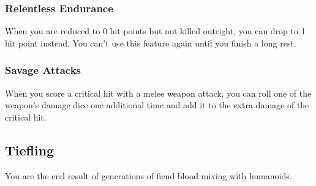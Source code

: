 \documentclass[10pt,twoside]{article}
\begin{document}
\begin{multicols}{2}
\subsubsection*{Relentless Endurance}
When you are reduced to 0 hit points but not killed outright, you can drop to 1 hit point instead. You can't use this feature again until you finish a long rest.

\subsubsection*{Savage Attacks}
When you score a critical hit with a melee weapon attack, you can roll one of the weapon's damage dice one additional time and add it to the extra damage of the critical hit.

\end{multicols}

\newpage


\subsection{Tiefling}

You are the end result of generations of fiend blood mixing with humanoids.
\end{document}
